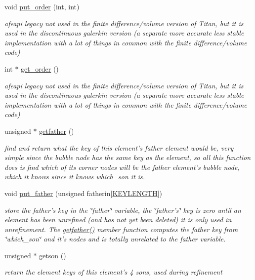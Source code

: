 \begin{CompactItemize}
void \hyperlink{classElement_a20}{put\_\-order} (int, int)
\begin{CompactList}\small\item\em afeapi legacy not used in the finite difference/volume version of Titan, but it is used in the discontinuous galerkin version (a separate more accurate less stable implementation with a lot of things in common with the finite difference/volume code) \item\end{CompactList}\item 
int $\ast$ \hyperlink{classElement_a21}{get\_\-order} ()
\begin{CompactList}\small\item\em afeapi legacy not used in the finite difference/volume version of Titan, but it is used in the discontinuous galerkin version (a separate more accurate less stable implementation with a lot of things in common with the finite difference/volume code) \item\end{CompactList}\item 
unsigned $\ast$ \hyperlink{classElement_a22}{getfather} ()
\begin{CompactList}\small\item\em find and return what the key of this element's father element would be, very simple since the bubble node has the same key as the element, so all this function does is find which of its corner nodes will be the father element's bubble node, which it knows since it knows which\_\-son it is. \item\end{CompactList}\item 
void \hyperlink{classElement_a23}{put\_\-father} (unsigned fatherin\mbox{[}\hyperlink{constant_8h_a10}{KEYLENGTH}\mbox{]})
\begin{CompactList}\small\item\em store the father's key in the \char`\"{}father\char`\"{} variable, the \char`\"{}father's\char`\"{} key is zero until an element has been unrefined (and has not yet been deleted) it is only used in unrefinement. The \hyperlink{classElement_a22}{getfather()} member function computes the father key from \char`\"{}which\_\-son\char`\"{} and it's nodes and is totally unrelated to the father variable. \item\end{CompactList}\item 
unsigned $\ast$ \hyperlink{classElement_a24}{getson} ()
\begin{CompactList}\small\item\em return the element keys of this element's 4 sons, used during refinement \item\end{CompactList}\item 

\end{CompactItemize}

